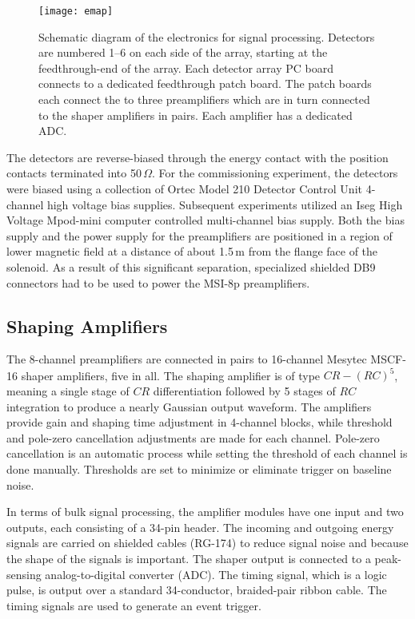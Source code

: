 \begin{figure}[t]
\centering
\texttt{[image: emap]}%
\caption[Schematic diagram of the electronics for signal processing]{Schematic diagram of the electronics for signal processing.  Detectors are numbered 1--6 on each side of the array, starting at the feedthrough-end of the array.  Each detector array PC board connects to a dedicated feedthrough patch board.  The patch boards each connect the to three preamplifiers which are in turn connected to the shaper amplifiers in pairs.  Each amplifier has a dedicated ADC.  }%
\label{emap}%
\end{figure}

The detectors are reverse-biased through the energy contact with the position contacts terminated into 50\,$\Omega$.  For the commissioning experiment, the detectors were biased using a collection of Ortec Model 210 Detector Control Unit 4-channel high voltage bias supplies.  Subsequent experiments utilized an Iseg High Voltage Mpod-mini computer controlled multi-channel bias supply.  Both the bias supply and the power supply for the preamplifiers are positioned in a region of lower magnetic field at a distance of about 1.5\,m from the flange face of the solenoid.  As a result of this significant separation, specialized shielded DB9 connectors had to be used to power the MSI-8p preamplifiers.

\subsection{Shaping Amplifiers}
The 8-channel preamplifiers are connected in pairs to 16-channel Mesytec MSCF-16 shaper amplifiers, five in all.  The shaping amplifier is of type $CR-(RC)^5$, meaning a single stage of $CR$ differentiation followed by 5 stages of $RC$ integration to produce a nearly Gaussian output waveform.  The amplifiers provide gain and shaping time adjustment in 4-channel blocks, while threshold and pole-zero cancellation adjustments are made for each channel. Pole-zero cancellation is an automatic process while setting the threshold of each channel is done manually.  Thresholds are set to minimize or eliminate trigger on baseline noise.

In terms of bulk signal processing, the amplifier modules have one input and two outputs, each consisting of a 34-pin header.  The incoming and outgoing energy signals are carried on shielded cables (RG-174) to reduce signal noise and because the shape of the signals is important.  The shaper output is connected to a peak-sensing analog-to-digital converter (ADC). The timing signal, which is a logic pulse, is output over a standard 34-conductor, braided-pair ribbon cable.  The timing signals are used to generate an event trigger.%

